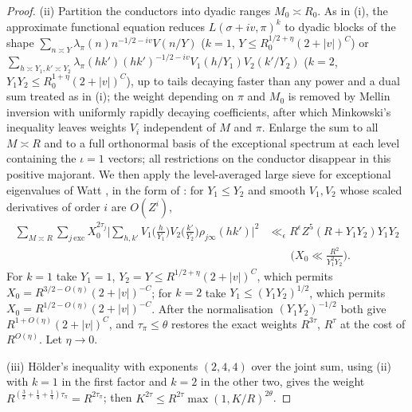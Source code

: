 \documentclass[11pt,colorlinks]{charlie}
\begin{document}
\begin{proof}
(ii) Partition the conductors into dyadic ranges $M_0\asymp R_0$. As in (i), the approximate functional equation reduces $L(\sigma+iv,\pi)^k$ to dyadic blocks of the shape $\sum_{n\asymp Y}\lambda_\pi(n)n^{-1/2-iv}V(n/Y)$ ($k=1$, $Y\le R_0^{1/2+\eta}(2+|v|)^C$) or $\sum_{h\asymp Y_1,k'\asymp Y_2}\lambda_\pi(hk')(hk')^{-1/2-iv}V_1(h/Y_1)V_2(k'/Y_2)$ ($k=2$, $Y_1Y_2\le R_0^{1+\eta}(2+|v|)^C$), up to tails decaying faster than any power and a dual sum treated as in (i); the weight depending on $\pi$ and $M_0$ is removed by Mellin inversion with uniformly rapidly decaying coefficients, after which Minkowski's inequality leaves weights $V_i$ independent of $M$ and $\pi$. Enlarge the sum to all $M\asymp R$ and to a full orthonormal basis of the exceptional spectrum at each level containing the $\iota=1$ vectors; all restrictions on the conductor disappear in this positive majorant. We then apply the level-averaged large sieve for exceptional eigenvalues of Watt \cite{Watt}, in the form of \cite[Proposition~3.5]{PascadiExp}: for $Y_1\le Y_2$ and smooth $V_1,V_2$ whose scaled derivatives of order $i$ are $O(Z^i)$,
\begin{equation}\label{eq:watt}
 \begin{split}
 \sum_{M\asymp R}\sum_{j\ \mathrm{exc}}X_0^{2\tau_j}\Big|\sum_{h,k'}V_1\Big(\frac h{Y_1}\Big)V_2\Big(\frac{k'}{Y_2}\Big)\rho_{j\infty}(hk')\Big|^2&\ll_\epsilon R^\epsilon Z^5(R+Y_1Y_2)Y_1Y_2\\
 &\qquad\Big(X_0\ll\frac{R^2}{Y_1^2Y_2}\Big).
 \end{split}
\end{equation}
For $k=1$ take $Y_1=1$, $Y_2=Y\le R^{1/2+\eta}(2+|v|)^C$, which permits $X_0=R^{3/2-O(\eta)}(2+|v|)^{-C}$; for $k=2$ take $Y_1\le(Y_1Y_2)^{1/2}$, which permits $X_0=R^{1/2-O(\eta)}(2+|v|)^{-C}$. After the normalisation $(Y_1Y_2)^{-1/2}$ both give $R^{1+O(\eta)}(2+|v|)^C$, and $\tau_\pi\le\theta$ restores the exact weights $R^{3\tau}$, $R^{\tau}$ at the cost of $R^{O(\eta)}$. Let $\eta\to0$.

(iii) H\"older's inequality with exponents $(2,4,4)$ over the joint sum, using (ii) with $k=1$ in the first factor and $k=2$ in the other two, gives the weight $R^{(\frac32+\frac14+\frac14)\tau_\pi}=R^{2\tau_\pi}$; then $K^{2\tau}\le R^{2\tau}\max(1,K/R)^{2\theta}$.
\end{proof}
\end{document}
